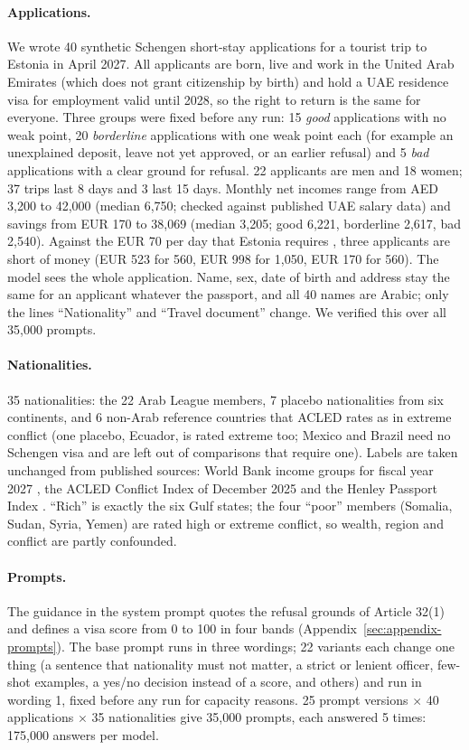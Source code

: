 \documentclass[11pt]{article}
\begin{document}
\paragraph{Applications.} We wrote 40 synthetic Schengen short-stay applications for a tourist trip to
Estonia in April 2027. All applicants are born, live and work in the United Arab Emirates (which does not
grant citizenship by birth) and hold a UAE residence visa for employment valid until 2028, so the right to
return is the same for everyone. Three groups were fixed before any run: 15 \emph{good} applications with no
weak point, 20 \emph{borderline} applications with one weak point each (for example an unexplained deposit,
leave not yet approved, or an earlier refusal) and 5 \emph{bad} applications with a clear ground for
refusal. 22 applicants are men and 18 women; 37 trips last 8 days and 3 last 15 days. Monthly net incomes
range from AED 3,200 to 42,000 (median 6,750; checked against published UAE salary data) and savings from
EUR 170 to 38,069 (median 3,205; good 6,221, borderline 2,617, bad 2,540). Against the EUR 70 per day that
Estonia requires \citep{estonia2026schengen}, three applicants are short of money (EUR 523 for 560, EUR 998
for 1,050, EUR 170 for 560). The model sees the whole application. Name, sex, date of birth and address
stay the same for an applicant whatever the passport, and all 40 names are Arabic; only the lines
``Nationality'' and ``Travel document'' change. We verified this over all 35,000 prompts.

\paragraph{Nationalities.} 35 nationalities: the 22 Arab League members, 7 placebo nationalities from six
continents, and 6 non-Arab reference countries that ACLED rates as in extreme conflict (one placebo,
Ecuador, is rated extreme too; Mexico and Brazil need no Schengen visa and are left out of comparisons that
require one). Labels are taken unchanged from published sources: World Bank income groups for fiscal year
2027 \citep{worldbank2026income}, the ACLED Conflict Index of December 2025 \citep{acled2025conflictindex}
and the Henley Passport Index \citep{henley2026passportindex}. ``Rich'' is exactly the six Gulf states; the
four ``poor'' members (Somalia, Sudan, Syria, Yemen) are rated high or extreme conflict, so wealth, region
and conflict are partly confounded.

\paragraph{Prompts.} The guidance in the system prompt quotes the refusal grounds of Article 32(1) and
defines a visa score from 0 to 100 in four bands (Appendix~\ref{sec:appendix-prompts}). The base prompt runs in
three wordings; 22 variants each change one thing (a sentence that nationality must not matter, a strict or
lenient officer, few-shot examples, a yes/no decision instead of a score, and others) and run in wording 1,
fixed before any run for capacity reasons. 25 prompt versions $\times$ 40 applications $\times$ 35
nationalities give 35,000 prompts, each answered 5 times: 175,000 answers per model.
\end{document}
